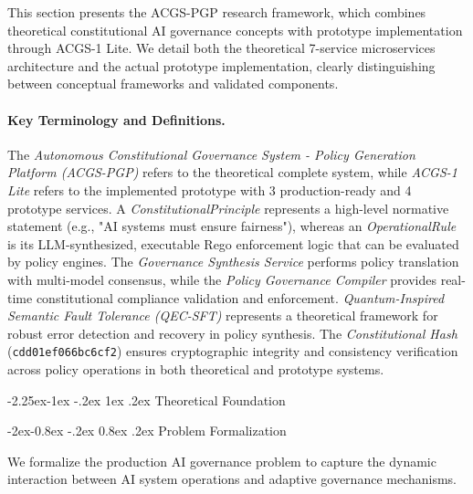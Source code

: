 \documentclass[manuscript,screen,9pt]{acmart}
\makeatletter
\renewcommand\subsection{\@startsection{subsection}{2}{\z@}%
  {-2.25ex\@plus -1ex \@minus -.2ex}%
  {1ex \@plus .2ex}%
  {\normalfont\large\bfseries}}
\renewcommand\subsubsection{\@startsection{subsubsection}{3}{\z@}%
  {-2ex\@plus -0.8ex \@minus -.2ex}%
  {0.8ex \@plus .2ex}%
  {\normalfont\normalsize\bfseries}}
\makeatother
\begin{document}
\begin{table}[!htb]
This section presents the ACGS-PGP research framework, which combines theoretical constitutional AI governance concepts with prototype implementation through ACGS-1 Lite. We detail both the theoretical 7-service microservices architecture and the actual prototype implementation, clearly distinguishing between conceptual frameworks and validated components.

\paragraph{Key Terminology and Definitions.} The \textit{Autonomous Constitutional Governance System - Policy Generation Platform (ACGS-PGP)} refers to the theoretical complete system, while \textit{ACGS-1 Lite} refers to the implemented prototype with 3 production-ready and 4 prototype services. A \textit{ConstitutionalPrinciple} represents a high-level normative statement (e.g., "AI systems must ensure fairness"), whereas an \textit{OperationalRule} is its LLM-synthesized, executable Rego enforcement logic that can be evaluated by policy engines. The \textit{Governance Synthesis Service} performs policy translation with multi-model consensus, while the \textit{Policy Governance Compiler} provides real-time constitutional compliance validation and enforcement. \textit{Quantum-Inspired Semantic Fault Tolerance (QEC-SFT)} represents a theoretical framework for robust error detection and recovery in policy synthesis. The \textit{Constitutional Hash} (\texttt{cdd01ef066bc6cf2}) ensures cryptographic integrity and consistency verification across policy operations in both theoretical and prototype systems.

\subsection{Theoretical Foundation}
\label{subsec:theoretical_foundation}

\subsubsection{Problem Formalization}
\label{subsubsec:problem_formalization}

We formalize the production AI governance problem to capture the dynamic interaction between AI system operations and adaptive governance mechanisms.


\end{table}
\end{document}

